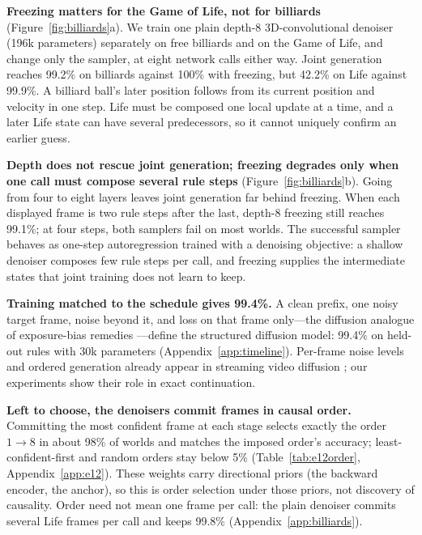 \documentclass[11pt]{article}
\begin{document}
\textbf{Freezing matters for the Game of Life, not for billiards} (Figure~\ref{fig:billiards}a). We train one plain depth-8 3D-convolutional denoiser (196k parameters) separately on free billiards and on the Game of Life, and change only the sampler, at eight network calls either way. Joint generation reaches 99.2\% on billiards against 100\% with freezing, but 42.2\% on Life against 99.9\%. A billiard ball's later position follows from its current position and velocity in one step. Life must be composed one local update at a time, and a later Life state can have several predecessors, so it cannot uniquely confirm an earlier guess.

\textbf{Depth does not rescue joint generation; freezing degrades only when one call must compose several rule steps} (Figure~\ref{fig:billiards}b). Going from four to eight layers leaves joint generation far behind freezing. When each displayed frame is two rule steps after the last, depth-8 freezing still reaches 99.1\%; at four steps, both samplers fail on most worlds. The successful sampler behaves as one-step autoregression trained with a denoising objective: a shallow denoiser composes few rule steps per call, and freezing supplies the intermediate states that joint training does not learn to keep.

\textbf{Training matched to the schedule gives 99.4\%.} A clean prefix, one noisy target frame, noise beyond it, and loss on that frame only---the diffusion analogue of exposure-bias remedies \citep{bengio2015scheduled, huang2025selfforcing}---define the structured diffusion model: 99.4\% on held-out rules with 30k parameters (Appendix~\ref{app:timeline}). Per-frame noise levels and ordered generation already appear in streaming video diffusion \citep{chen2024diffusion, ruhe2024rolling, kim2024fifo, yin2024causvid, song2025history, magi2025}; our experiments show their role in exact continuation.

\textbf{Left to choose, the denoisers commit frames in causal order.} Committing the most confident frame at each stage \citep{chang2022maskgit, kim2025train} selects exactly the order $1{\to}8$ in about 98\% of worlds and matches the imposed order's accuracy; least-confident-first and random orders stay below 5\% (Table~\ref{tab:e12order}, Appendix~\ref{app:e12}). These weights carry directional priors (the backward encoder, the anchor), so this is order selection under those priors, not discovery of causality. Order need not mean one frame per call: the plain denoiser commits several Life frames per call and keeps 99.8\% (Appendix~\ref{app:billiards}).
\end{document}
